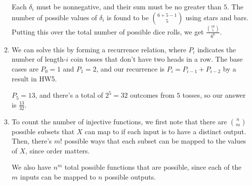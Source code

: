 \documentclass[12pt]{article}
\begin{document}
\begin{enumerate}
          Each $\delta_i$ must be nonnegative, and their sum must be no greater than $5$.
          The number of possible values of $\delta_i$ is found to be $\binom{6+5-1}{5}$ using stars and bars.
          Putting this over the total number of possible dice rolls, we get $\boxed{\frac{\binom{10}{5}}{6^6}}$.
    \item We can solve this by forming a recurrence relation, where $P_i$ indicates the number of length-$i$ coin tosses that don't have two heads in a row.
          The base cases are $P_0=1$ and $P_1=2$, and our recurrence is $P_i=P_{i-1}+P_{i-2}$
          by a result in HW5.

          $P_5=13$, and there's a total of $2^5=32$ outcomes from $5$ tosses, so our answer is $\boxed{\frac{13}{32}}$.
    \item To count the number of injective functions, we first note that there are $\binom{n}{m}$
          possible subsets that $X$ can map to if each input is to have a distinct output.
          Then, there's $m!$ possible ways that each subset can be mapped to the values of $X$, since order matters.

          We also have $n^m$ total possible functions that are possible, since
          each of the $m$ inputs can be mapped to $n$ possible outputs.


\end{enumerate}
\end{document}
